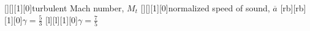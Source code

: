    [][][1][0]{turbulent Mach number, $M_t$}
   [][][1][0]{normalized speed of sound, $\overline{a}$}
   [rb][rb][1][0]{$\gamma=\frac{5}{3}$}
   [l][l][1][0]{$\gamma=\frac{7}{5}$}

